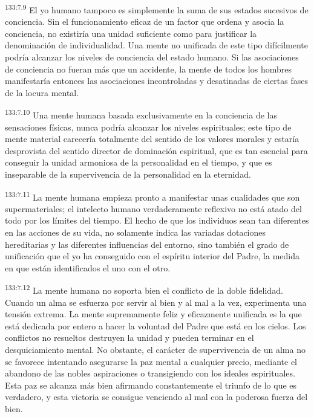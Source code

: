 \par 
\textsuperscript{133:7.9} El yo humano tampoco es simplemente la suma de sus estados sucesivos de conciencia. Sin el funcionamiento eficaz de un factor que ordena y asocia la conciencia, no existiría una unidad suficiente como para justificar la denominación de individualidad. Una mente no unificada de este tipo difícilmente podría alcanzar los niveles de conciencia del estado humano. Si las asociaciones de conciencia no fueran más que un accidente, la mente de todos los hombres manifestaría entonces las asociaciones incontroladas y desatinadas de ciertas fases de la locura mental.

\par 
\textsuperscript{133:7.10} Una mente humana basada exclusivamente en la conciencia de las sensaciones físicas, nunca podría alcanzar los niveles espirituales; este tipo de mente material carecería totalmente del sentido de los valores morales y estaría desprovista del sentido director de dominación espiritual, que es tan esencial para conseguir la unidad armoniosa de la personalidad en el tiempo, y que es inseparable de la supervivencia de la personalidad en la eternidad.

\par 
\textsuperscript{133:7.11} La mente humana empieza pronto a manifestar unas cualidades que son supermateriales; el intelecto humano verdaderamente reflexivo no está atado del todo por los límites del tiempo. El hecho de que los individuos sean tan diferentes en las acciones de su vida, no solamente indica las variadas dotaciones hereditarias y las diferentes influencias del entorno, sino también el grado de unificación que el yo ha conseguido con el espíritu interior del Padre, la medida en que están identificados el uno con el otro.

\par 
\textsuperscript{133:7.12} La mente humana no soporta bien el conflicto de la doble fidelidad. Cuando un alma se esfuerza por servir al bien y al mal a la vez, experimenta una tensión extrema. La mente supremamente feliz y eficazmente unificada es la que está dedicada por entero a hacer la voluntad del Padre que está en los cielos. Los conflictos no resueltos destruyen la unidad y pueden terminar en el desquiciamiento mental. No obstante, el carácter de supervivencia de un alma no se favorece intentando asegurarse la paz mental a cualquier precio, mediante el abandono de las nobles aspiraciones o transigiendo con los ideales espirituales. Esta paz se alcanza más bien afirmando constantemente el triunfo de lo que es verdadero, y esta victoria se consigue venciendo al mal con la poderosa fuerza del bien.

